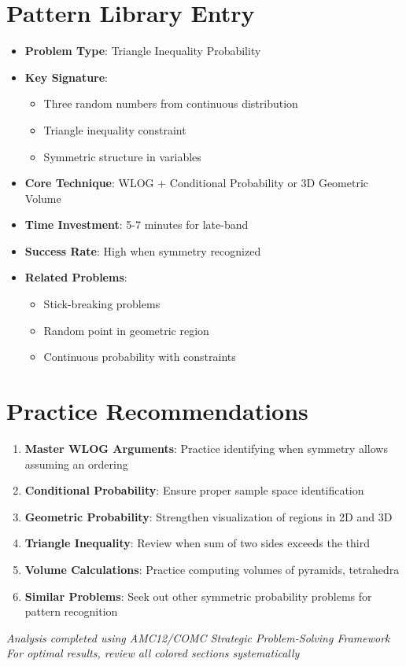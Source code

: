 \documentclass[11pt]{article}
\begin{document}
\section*{Pattern Library Entry}

\begin{itemize}[leftmargin=*]
    \item \textbf{Problem Type}: Triangle Inequality Probability
    \item \textbf{Key Signature}: 
    \begin{itemize}
        \item Three random numbers from continuous distribution
        \item Triangle inequality constraint
        \item Symmetric structure in variables
    \end{itemize}
    \item \textbf{Core Technique}: WLOG + Conditional Probability or 3D Geometric Volume
    \item \textbf{Time Investment}: 5-7 minutes for late-band
    \item \textbf{Success Rate}: High when symmetry recognized
    \item \textbf{Related Problems}: 
    \begin{itemize}
        \item Stick-breaking problems
        \item Random point in geometric region
        \item Continuous probability with constraints
    \end{itemize}
\end{itemize}

\section*{Practice Recommendations}

\begin{enumerate}
    \item \textbf{Master WLOG Arguments}: Practice identifying when symmetry allows assuming an ordering
    \item \textbf{Conditional Probability}: Ensure proper sample space identification
    \item \textbf{Geometric Probability}: Strengthen visualization of regions in 2D and 3D
    \item \textbf{Triangle Inequality}: Review when sum of two sides exceeds the third
    \item \textbf{Volume Calculations}: Practice computing volumes of pyramids, tetrahedra
    \item \textbf{Similar Problems}: Seek out other symmetric probability problems for pattern recognition
\end{enumerate}

\vfill

\begin{center}
\textit{Analysis completed using AMC12/COMC Strategic Problem-Solving Framework}\\
\textit{For optimal results, review all colored sections systematically}
\end{center}
\end{document}
